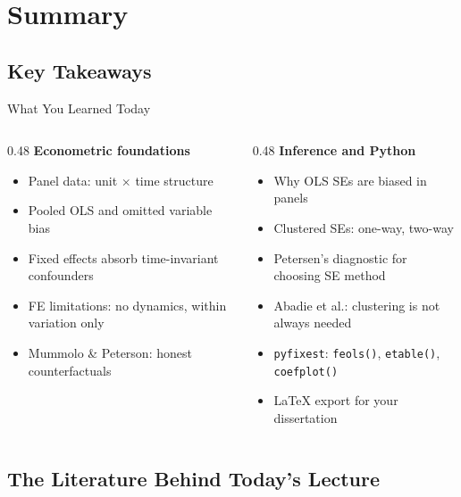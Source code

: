 \documentclass[9pt,aspectratio=169]{beamer}
\newcommand{\py}[1]{\lstinline[language=Python]{#1}}
\begin{document}
\section{Summary}
\subsection{Key Takeaways}

\begin{frame}[fragile]{What You Learned Today}

\begin{columns}[T]
\begin{column}{0.48\textwidth}
\textbf{Econometric foundations}
\begin{itemize}
    \item Panel data: unit $\times$ time structure
    \item Pooled OLS and omitted variable bias
    \item Fixed effects absorb time-invariant confounders
    \item FE limitations: no dynamics, within variation only
    \item Mummolo \& Peterson: honest counterfactuals
\end{itemize}
\end{column}
\begin{column}{0.48\textwidth}
\textbf{Inference and Python}
\begin{itemize}
    \item Why OLS SEs are biased in panels
    \item Clustered SEs: one-way, two-way
    \item Petersen's diagnostic for choosing SE method
    \item Abadie et al.: clustering is not always needed
    \item \texttt{pyfixest}: \py{feols()}, \py{etable()}, \py{coefplot()}
    \item \LaTeX{} export for your dissertation
\end{itemize}
\end{column}
\end{columns}

\end{frame}


\subsection{The Literature Behind Today's Lecture}
\end{document}
